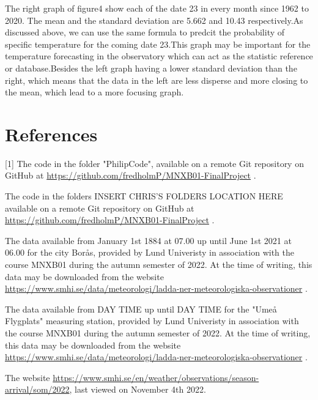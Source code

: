 \documentclass[a4, 12pt]{article}
\begin{document}
The right graph of figure4 show each of the date 23 in every month since 1962 to 2020. The mean and the standard deviation are 5.662 and 10.43 respectively.As discussed above, we can use the same formula to predcit the probability of specific temperature for the coming date 23.This graph may be important for the temperature forecasting in the observatory which can act as the statistic reference or database.Besides the left graph having a lower standard deviation than the right, which means that the data in the left are less disperse and more closing to the mean, which lead to a more focusing graph.





\newpage
\section{References}
[1] The code in the folder "PhilipCode", available on a remote Git repository on GitHub at \href{https://github.com/fredholmP/MNXB01-FinalProject}{https://github.com/fredholmP/MNXB01-FinalProject} . \newline

\noindent [2] The code in the folders INSERT CHRIS'S FOLDERS LOCATION HERE available on a remote Git repository on GitHub at \href{https://github.com/fredholmP/MNXB01-FinalProject}{https://github.com/fredholmP/MNXB01-FinalProject} . \newline

\noindent [3] The data available from January 1st 1884 at 07.00 up until June 1st 2021 at 06.00 for the city Borås, provided by Lund Univeristy in association with the course MNXB01 during the autumn semester of 2022. At the time of writing, this data may be downloaded from the website \href{https://www.smhi.se/data/meteorologi/ladda-ner-meteorologiska-observationer}{https://www.smhi.se/data/meteorologi/ladda-ner-meteorologiska-observationer}  . \newline


\noindent [4] The data available from DAY TIME up until DAY TIME for the "Umeå Flygplats" measuring station, provided by Lund Univeristy in association with the course MNXB01 during the autumn semester of 2022. At the time of writing, this data may be downloaded from the website \href{https://www.smhi.se/data/meteorologi/ladda-ner-meteorologiska-observationer}{https://www.smhi.se/data/meteorologi/ladda-ner-meteorologiska-observationer} . \newline

\noindent [5] The website \href{https://www.smhi.se/en/weather/observations/season-arrival/som/2022}{https://www.smhi.se/en/weather/observations/season-arrival/som/2022}, last viewed on November 4th 2022.
\end{document}
